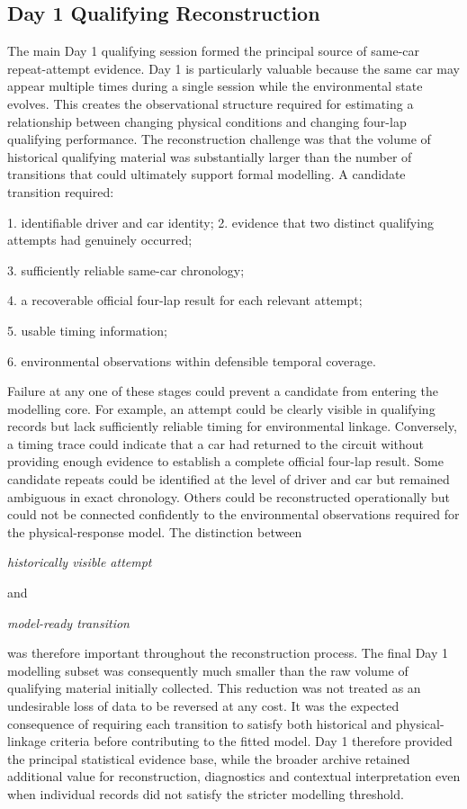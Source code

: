 \subsection{Day 1 Qualifying Reconstruction}
The main Day 1 qualifying session formed the principal source of same-car repeat-attempt evidence. Day 1 is particularly valuable because the same car may appear multiple times during a single session while the environmental state evolves. This creates the observational structure required for estimating a relationship between changing physical conditions and changing four-lap qualifying performance. The reconstruction challenge was that the volume of historical qualifying material was substantially larger than the number of transitions that could ultimately support formal modelling. A candidate transition required:

1. identifiable driver and car identity; 2. evidence that two distinct qualifying attempts had genuinely occurred;

3. sufficiently reliable same-car chronology;

4. a recoverable official four-lap result for each relevant attempt;

5. usable timing information;

6. environmental observations within defensible temporal coverage.

Failure at any one of these stages could prevent a candidate from entering the modelling core. For example, an attempt could be clearly visible in qualifying records but lack sufficiently reliable timing for environmental linkage. Conversely, a timing trace could indicate that a car had returned to the circuit without providing enough evidence to establish a complete official four-lap result. Some candidate repeats could be identified at the level of driver and car but remained ambiguous in exact chronology. Others could be reconstructed operationally but could not be connected confidently to the environmental observations required for the physical-response model. The distinction between

\begin{center}\textit{historically visible attempt}\end{center}

and

\begin{center}\textit{model-ready transition}\end{center}

was therefore important throughout the reconstruction process. The final Day 1 modelling subset was consequently much smaller than the raw volume of qualifying material initially collected. This reduction was not treated as an undesirable loss of data to be reversed at any cost. It was the expected consequence of requiring each transition to satisfy both historical and physical-linkage criteria before contributing to the fitted model. Day 1 therefore provided the principal statistical evidence base, while the broader archive retained additional value for reconstruction, diagnostics and contextual interpretation even when individual records did not satisfy the stricter modelling threshold.

